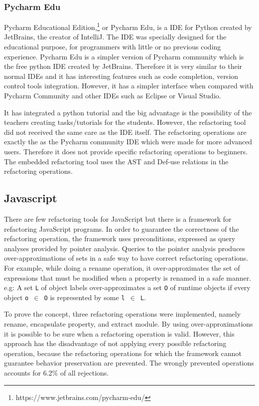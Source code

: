\subsubsection{Pycharm Edu}
Pycharm Educational Edition,\footnote{https://www.jetbrains.com/pycharm-edu/}
 or Pycharm Edu, is a IDE for Python created by JetBrains,
the creator of IntelliJ.
The IDE was specially designed for the educational purpose, for programmers
with little or no previous coding experience.
Pycharm Edu is a simpler version of Pycharm community which is the free
python IDE created by JetBrains.
Therefore it is very similar to their normal IDEs and it has interesting features
such as code completion, version control tools integration.
However, it has a simpler interface when compared with
Pycharm Community and other IDEs such as Eclipse or Visual Studio. %

It has integrated a python tutorial and the big advantage is the possibility of
the teachers creating tasks/tutorials for the students.
However, the refactoring tool did not received the same care as the IDE itself.
The refactoring operations are exactly the as the Pycharm community IDE which were made
for more advanced users.
Therefore it does not provide specific refactoring operations to beginners.
The embedded refactoring tool uses the AST and Def-use relations in the refactoring
operations.

\subsection{Javascript}
There are few refactoring tools for JavaScript but there is a framework
\cite{feldthaus2011tool} for refactoring JavaScript programs. %
In order to guarantee the correctness of the refactoring operation, the framework
uses preconditions, expressed as query analyses provided by pointer analysis. %
Queries to the pointer analysis produces over-approximations of sets in a safe way to
have correct refactoring operations.
For example, while doing a rename operation, it over-approximates the set of expressions
that must be modified when a property is renamed in a safe manner.
e.g: A set {\tt L} of object labels over-approximates a set {\tt O} of runtime objects if every
object {\tt o $\in$ O} is represented by some {\tt l $\in$ L}.

To prove the concept, three refactoring operations were implemented, namely rename,
encapsulate property, and extract module.
By using over-approximations it is possible to be sure when a refactoring
operation is valid.
However, this approach has the disadvantage of not applying every possible refactoring operation,
because the refactoring operations for which the framework cannot guarantee behavior
preservation are prevented.
The wrongly prevented operations accounts for 6.2\% of all rejections.
